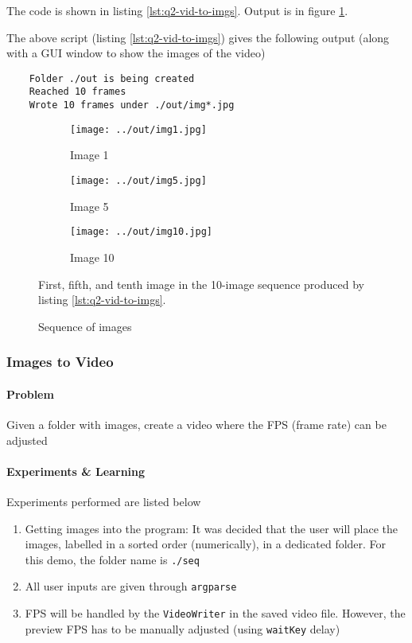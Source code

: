 The code is shown in listing \ref{lst:q2-vid-to-imgs}. Output is in figure \ref{fig:q2-v2i-seq}.



The above script (listing \ref{lst:q2-vid-to-imgs}) gives the following output (along with a GUI window to show the images of the video)

\begin{verbatim}
    Folder ./out is being created
    Reached 10 frames
    Wrote 10 frames under ./out/img*.jpg
\end{verbatim}

\begin{figure}[t]
    \centering
    \begin{subfigure}[b]{0.3\textwidth}
        \texttt{[image: ../out/img1.jpg]}
        \caption{Image 1}
    \end{subfigure}
    \begin{subfigure}[b]{0.3\textwidth}
        \texttt{[image: ../out/img5.jpg]}
        \caption{Image 5}
    \end{subfigure}
    \begin{subfigure}[b]{0.3\textwidth}
        \texttt{[image: ../out/img10.jpg]}
        \caption{Image 10}
    \end{subfigure}
    \caption{Sequence of images}
    \label{fig:q2-v2i-seq}
    \small
        First, fifth, and tenth image in the 10-image sequence produced by listing \ref{lst:q2-vid-to-imgs}.
\end{figure}

\subsubsection{Images to Video}

\paragraph{Problem}
Given a folder with images, create a video where the FPS (frame rate) can be adjusted

\paragraph{Experiments \& Learning}
Experiments performed are listed below

\begin{enumerate}
    \item Getting images into the program: It was decided that the user will place the images, labelled in a sorted order (numerically), in a dedicated folder. For this demo, the folder name is \texttt{./seq}
    \item All user inputs are given through \texttt{argparse}
    \item FPS will be handled by the \texttt{VideoWriter} in the saved video file. However, the preview FPS has to be manually adjusted (using \texttt{waitKey} delay)
\end{enumerate}

